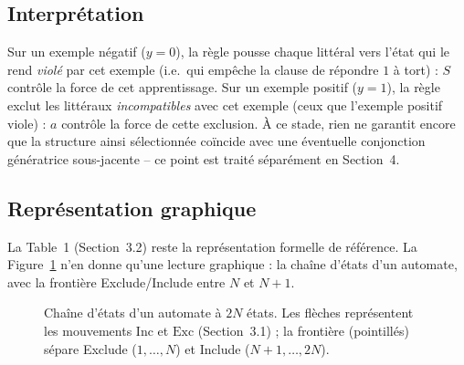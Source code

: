 \documentclass[12pt,a4paper]{article}
\newcommand{\Inc}{\ensuremath{\mathrm{Inc}}}
\newcommand{\Exc}{\ensuremath{\mathrm{Exc}}}
\begin{document}
\subsection{Interprétation}

Sur un exemple négatif ($y=0$), la règle pousse chaque littéral vers l'état
qui le rend \emph{violé} par cet exemple (i.e.\ qui empêche la clause de
répondre $1$ à tort) : $S$ contrôle la force de cet apprentissage. Sur un
exemple positif ($y=1$), la règle exclut les littéraux \emph{incompatibles}
avec cet exemple (ceux que l'exemple positif viole) : $a$ contrôle la force
de cette exclusion. À ce stade, rien ne garantit encore que la structure
ainsi sélectionnée coïncide avec une éventuelle conjonction génératrice
sous-jacente -- ce point est traité séparément en Section~4.

\subsection{Représentation graphique}

La Table~1 (Section~3.2) reste la représentation formelle de référence. La
Figure~\ref{fig:automate} n'en donne qu'une lecture graphique : la chaîne
d'états d'un automate, avec la frontière Exclude/Include entre $N$ et $N{+}1$.

\begin{figure}[h]
\centering
{}
\caption{Chaîne d'états d'un automate à $2N$ états. Les flèches représentent
les mouvements $\Inc$ et $\Exc$ (Section~3.1) ; la frontière (pointillés)
sépare Exclude ($1,\ldots,N$) et Include ($N{+}1,\ldots,2N$).}
\label{fig:automate}
\end{figure}
\end{document}
